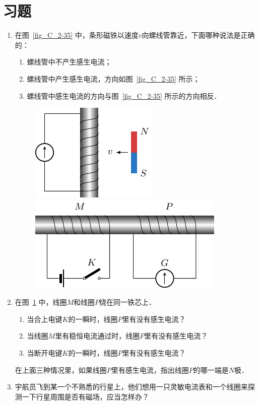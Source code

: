 \section*{习题}
\begin{enumerate}
    \item 在图~\ref{fig_C_2-35} 中，条形磁铁以速度$v$向螺线管靠近，下面哪种说法是正确的：
    \begin{enumerate}
		\item 螺线管中不产生感生电流；
		\item 螺线管中产生感生电流，方向如图~\ref{fig_C_2-35} 所示；
		\item 螺线管中感生电流的方向与图~\ref{fig_C_2-35} 所示的方向相反．
    \end{enumerate}
    \begin{figure}[htbp]
    	\centering
    	\begin{minipage}[t]{0.48\textwidth}
    		\centering
    		\includegraphics{fig/C/2-35.pdf}
    		\caption{}\label{fig_C_2-35}
    	\end{minipage}
    	\begin{minipage}[t]{0.48\textwidth}
    		\centering
    		\includegraphics{fig/C/2-36.pdf}
    		\caption{}\label{fig_C_2-36}
    	\end{minipage}
    \end{figure}
    
    \item 在图~\ref{fig_C_2-36} 中，线圈$M$和线圈$P$绕在同一铁芯上．
    \begin{enumerate}
        \item 当合上电键$K$的一瞬时，线圈$P$里有没有感生电流？
        \item 当线圈$M$里有稳恒电流通过时，线圈$P$里有没有感生电流？
        \item 当断开电键$K$的一瞬时，线圈$P$里有没有感生电流？
    \end{enumerate}
    在上面三种情况里，如果线圈$P$里有感生电流，指出线圈$P$的哪一端是$N$极．
    \item 宇航员飞到某一个不熟悉的行星上，他们想用一只灵敏电流表和一个线圈来探测一下行星周围是否有磁场，应当怎样办？
   


\end{enumerate}
